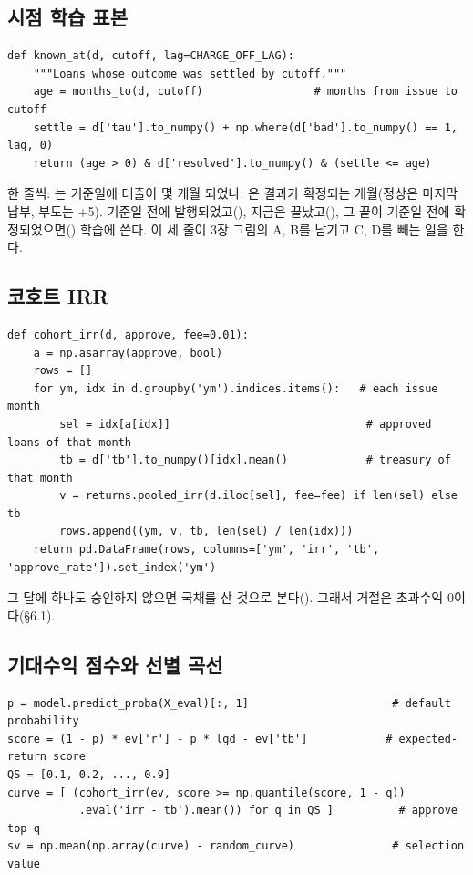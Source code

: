\subsection*{시점 학습 표본}
\begin{lstlisting}
def known_at(d, cutoff, lag=CHARGE_OFF_LAG):
    """Loans whose outcome was settled by cutoff."""
    age = months_to(d, cutoff)                 # months from issue to cutoff
    settle = d['tau'].to_numpy() + np.where(d['bad'].to_numpy() == 1, lag, 0)
    return (age > 0) & d['resolved'].to_numpy() & (settle <= age)
\end{lstlisting}
한 줄씩: 는 기준일에 대출이 몇 개월 되었나. 은 결과가 확정되는 개월(정상은 마지막 납부, 부도는 +5). 기준일 전에 발행되었고(), 지금은 끝났고(), 그 끝이 기준일 전에 확정되었으면() 학습에 쓴다. 이 세 줄이 3장 그림의 A, B를 남기고 C, D를 빼는 일을 한다.

\subsection*{코호트 IRR}
\begin{lstlisting}
def cohort_irr(d, approve, fee=0.01):
    a = np.asarray(approve, bool)
    rows = []
    for ym, idx in d.groupby('ym').indices.items():   # each issue month
        sel = idx[a[idx]]                              # approved loans of that month
        tb = d['tb'].to_numpy()[idx].mean()            # treasury of that month
        v = returns.pooled_irr(d.iloc[sel], fee=fee) if len(sel) else tb
        rows.append((ym, v, tb, len(sel) / len(idx)))
    return pd.DataFrame(rows, columns=['ym', 'irr', 'tb', 'approve_rate']).set_index('ym')
\end{lstlisting}
그 달에 하나도 승인하지 않으면 국채를 산 것으로 본다(). 그래서 거절은 초과수익 0이다(\S6.1).

\subsection*{기대수익 점수와 선별 곡선}
\begin{lstlisting}
p = model.predict_proba(X_eval)[:, 1]                      # default probability
score = (1 - p) * ev['r'] - p * lgd - ev['tb']            # expected-return score
QS = [0.1, 0.2, ..., 0.9]
curve = [ (cohort_irr(ev, score >= np.quantile(score, 1 - q))
           .eval('irr - tb').mean()) for q in QS ]          # approve top q
sv = np.mean(np.array(curve) - random_curve)               # selection value
\end{lstlisting}

